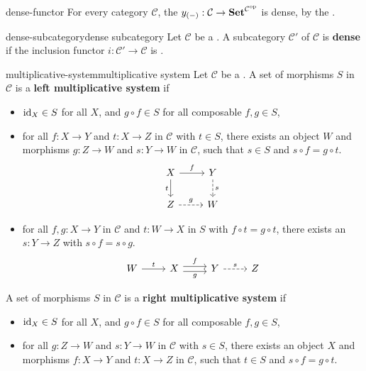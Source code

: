 \begin{example}{dense-functor}
    For every category $\mathcal{C}$, the  $y_{(-)} : \mathcal{C} \to \textbf{Set}^{\mathcal{C}^\textup{op}}$ is dense, by the .
\end{example}

\begin{topic}{dense-subcategory}{dense subcategory}
    Let $\mathcal{C}$ be a . A subcategory $\mathcal{C'}$ of $\mathcal{C}$ is \textbf{dense} if the inclusion functor $i : \mathcal{C}' \to \mathcal{C}$ is .
\end{topic}

\begin{topic}{multiplicative-system}{multiplicative system}
    Let $\mathcal{C}$ be a . A set of morphisms $S$ in $\mathcal{C}$ is a \textbf{left multiplicative system} if
    \begin{itemize}
        \item $\textup{id}_X \in S$ for all $X$, and $g \circ f \in S$ for all composable $f, g \in S$,
        \item for all $f : X \to Y$ and $t : X \to Z$ in $\mathcal{C}$ with $t \in S$, there exists an object $W$ and morphisms $g : Z \to W$ and $s : Y \to W$ in $\mathcal{C}$, such that $s \in S$ and $s \circ f = g \circ t$.
        \[ \begin{tikzcd} X \arrow{r}{f} \arrow[swap]{d}{t} & Y \arrow[dashed]{d}{s} \\ Z \arrow[dashed]{r}{g} & W \end{tikzcd} \]
        \item for all $f, g : X \to Y$ in $\mathcal{C}$ and $t : W \to X$ in $S$ with $f \circ t = g \circ t$, there exists an $s : Y \to Z$ with $s \circ f = s \circ g$.
        \[ \begin{tikzcd} W \arrow{r}{t} & X \arrow[shift left=0.25em]{r}{f} \arrow[swap, shift right=0.25em]{r}{g} & Y \arrow[dashed]{r}{s} & Z \end{tikzcd} \]
    \end{itemize}
    A set of morphisms $S$ in $\mathcal{C}$ is a \textbf{right multiplicative system} if
    \begin{itemize}
        \item $\textup{id}_X \in S$ for all $X$, and $g \circ f \in S$ for all composable $f, g \in S$,
        \item for all $g : Z \to W$ and $s : Y \to W$ in $\mathcal{C}$ with $s \in S$, there exists an object $X$ and morphisms $f : X \to Y$ and $t : X \to Z$ in $\mathcal{C}$, such that $t \in S$ and $s \circ f = g \circ t$.

\end{itemize}
\end{topic}
